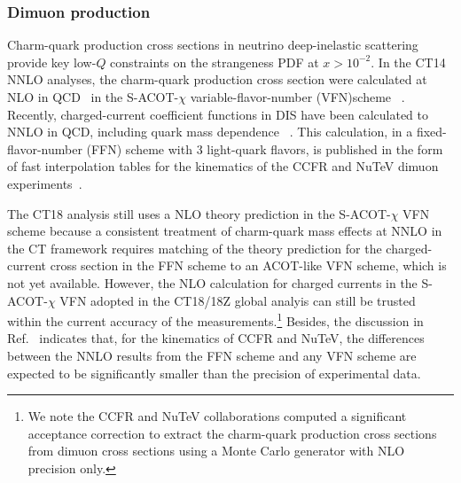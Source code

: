 %
%

\subsubsection{Dimuon production
\label{sec:Qualitydimuon}}


Charm-quark production cross sections in neutrino deep-inelastic scattering provide key low-$Q$ constraints on the strangeness PDF at $x > 10^{-2}$.
In the CT14 NNLO analyses, the charm-quark production cross section were calculated at NLO in
QCD~\cite{Gottschalk:1980rv,Gluck:1997sj,Blumlein:2011zu} in the S-ACOT-$\chi$ variable-flavor-number (VFN)scheme ~\cite{Aivazis:1993kh,Collins:1998rz,Kramer:2000hn,Tung:2001mv}.
Recently, charged-current coefficient functions in DIS have been calculated
to NNLO in QCD, including quark mass dependence ~\cite{Berger:2016inr,Gao:2017kkx}.
This calculation, in a fixed-flavor-number (FFN) scheme with 3 light-quark flavors,  is published in the form of fast interpolation tables for the kinematics of the CCFR and NuTeV dimuon experiments~\cite{Goncharov:2001qe,Mason:2006qa}.


The CT18 analysis still uses a NLO theory prediction in the S-ACOT-$\chi$ VFN scheme because
a consistent treatment of charm-quark mass effects at NNLO
in the CT framework requires matching of the theory prediction for the charged-current cross section in the FFN scheme to an ACOT-like VFN scheme, which is not yet available.
However, the NLO calculation for charged currents in the S-ACOT-$\chi$ VFN adopted in the CT18/18Z global analyis
can still be trusted within the current accuracy of the measurements.\footnote{We note the CCFR and NuTeV collaborations computed a significant acceptance correction to extract the charm-quark production cross sections from dimuon cross sections using a Monte Carlo generator with NLO precision only.}
%
Besides, the discussion in Ref.~\cite{Gao:2017kkx} indicates that, for the kinematics of CCFR and NuTeV, the differences between the NNLO results from the FFN scheme and any VFN scheme are expected to be significantly smaller than the precision of experimental data.

